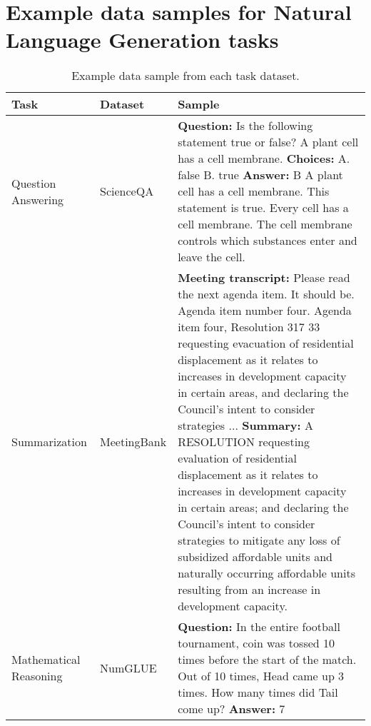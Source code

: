 \section{Example data samples for Natural Language Generation tasks}

\begin{table}
    \centering
    \caption{Example data sample from each task dataset.}
    \label{tab:DataSamples}
    \begin{tabular}{|l|l|p{8cm}|}
        \hline
        \textbf{Task} & \textbf{Dataset} & \textbf{Sample} \\ \hline
        Question Answering & ScienceQA & \textbf{Question:} \newline Is the following statement true or false? \newline A plant cell has a cell membrane. \newline \textbf{Choices:} \newline A. false \newline B. true \newline \newline \textbf{Answer:} B \newline A plant cell has a cell membrane. \newline This statement is true. Every cell has a cell membrane. The cell membrane controls which substances enter and leave the cell. \\ \hline
        Summarization & MeetingBank & \textbf{Meeting transcript:} \newline Please read the next agenda item. It should be. Agenda item number four. Agenda item four, Resolution 317 33 requesting evacuation of residential displacement as it relates to increases in development capacity in certain areas, and declaring the Council's intent to consider strategies ... \newline \newline \textbf{Summary:} A RESOLUTION requesting evaluation of residential displacement as it relates to increases in development capacity in certain areas; and declaring the Council’s intent to consider strategies to mitigate any loss of subsidized affordable units and naturally occurring affordable units resulting from an increase in development capacity. \\ \hline
        Mathematical Reasoning & NumGLUE & \textbf{Question:} \newline In the entire football tournament, coin was tossed 10 times before the start of the match. Out of 10 times, Head came up 3 times. How many times did Tail come up? \newline \newline \textbf{Answer:} 7 \\ \hline
    \end{tabular}
\end{table}
